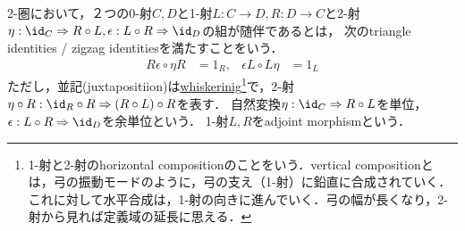 \documentclass[uplatex,dvipdfmx]{jsreport}
\begin{document}
\begin{definition}
    2-圏において，２つの0-射$C,D$と1-射$L:C\to D,R:D\to C$と2-射$\eta:\id_C\Rightarrow R\circ L,\epsilon:L\circ R\Rightarrow\id_D$の組が随伴であるとは，
    次のtriangle identities / zigzag identitiesを満たすことをいう．
    \begin{align*}
        R\epsilon\circ\eta R&=1_R,&\epsilon L\circ L\eta&=1_L
    \end{align*}
    ただし，並記(juxtapositiion)は\href{https://ncatlab.org/nlab/show/whiskering}{whiskerinig}\footnote{1-射と2-射のhorizontal compositionのことをいう．vertical compositionとは，弓の振動モードのように，弓の支え（1-射）に鉛直に合成されていく．これに対して水平合成は，1-射の向きに進んでいく．弓の幅が長くなり，2-射から見れば定義域の延長に思える．}で，2-射$\eta\circ R:\id_R\circ R\Rightarrow (R\circ L)\circ R$を表す．
    自然変換$\eta:\id_C\Rightarrow R\circ L$を単位，$\epsilon:L\circ R\Rightarrow\id_D$を余単位という．
    1-射$L,R$をadjoint morphismという．
\end{definition}
\end{document}
